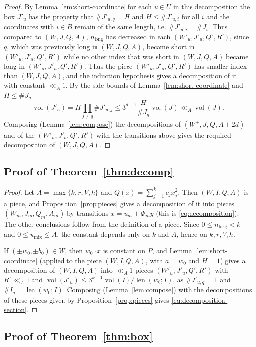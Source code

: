 \documentclass[a4paper,reqno,12pt]{amsart}
\theoremstyle{plain}
\theoremstyle{plain}
\theoremstyle{remark}
\theoremstyle{plain}
\newcommand{\vol}{\operatorname{vol}}
\newcommand{\len}{\operatorname{len}}
\theoremstyle{plain}
\theoremstyle{plain}
\begin{document}
{\begin{proof}
By Lemma \ref{lem:short-coordinate} for each $u \in U$ in this decomposition 
the box $J'_u$ has the property that $\# J'_{u,q} = H$ and $H \leq \# J'_{u,i}$ for all $i$
and the coordinates with $i \in B$ remain of the same length, i.e. $\# J'_{u,i} = \# J_i$. 
Thus compared to $(W, J, Q, A)$, $n_{\text{long}}$ has decreased in each $(W'_u,J'_u,Q',R')$, 
since $q$, which was previously long in $(W,J, Q, A)$, 
became short in $(W'_u,J'_u,Q',R')$ while no other index that was short 
in $(W, J, Q, A)$ became long in $(W'_u,J'_u,Q',R')$. 
Thus the piece $(W'_u,J'_u,Q',R')$ has smaller index than $(W, J, Q, A)$, and the
induction hypothesis gives a decomposition of it with constant $\ll_A1$. By the side bounds of
Lemma~\ref{lem:short-coordinate} and $H\le\#J_q$,
\[
 \vol(J'_u)=H\prod_{j\ne q}\#J'_{u,j}\le3^{d-1}\frac{H}{\#J_q}\vol(J)\ll_A\vol(J).
\]
Composing (Lemma~\ref{lem:compose}) the decompositions of $(W^+,J,Q,A+2d)$ and of the
$(W'_u,J'_u,Q',R')$ with the transitions above gives the required decomposition of $(W,J,Q,A)$.
\end{proof}

\subsection{Proof of Theorem~\ref{thm:decomp}}\label{sec:proof-decomp}
\begin{proof}
Let $A=\max\{k,r,V,h\}$ and $Q(x)=\sum_{j=1}^kc_jx_j^2$. Then $(W,I,Q,A)$ is a piece, and
Proposition~\ref{prop:pieces} gives a decomposition of it into pieces
$(W_m,J_m,Q_m,A_m)$ by transitions $x=u_m+\Phi_my$ (this is \eqref{eq:decomposition}). The other
conclusions follow from the definition of a piece.
Since $0\le n_{\mathrm{long}}<k$ and $0\le n_{\mathrm{mix}}\le A$, the constant depends only on $k$ and
$A$, hence on $k,r,V,h$.

If $(\pm w_0,\pm b_0)\in W$, then $w_0\cdot x$ is constant on $P$, and Lemma~\ref{lem:short-coordinate}
(applied to the piece $(W,I,Q,A)$, with $a=w_0$ and $H=1$) gives a decomposition of $(W,I,Q,A)$ into
$\ll_A1$ pieces $(W'_u,J'_u,Q',R')$ with $R'\ll_A1$ and $\vol(J'_u)\le3^{k-1}\vol(I)/\len(w_0;I)$, as
$\#J'_{u,q}=1$ and $\#I_q=\len(w_0;I)$. Composing (Lemma~\ref{lem:compose}) with the decompositions of
these pieces given by Proposition~\ref{prop:pieces} gives \eqref{eq:decomposition-section}.
\end{proof}

\subsection{Proof of Theorem~\ref{thm:box}}\label{sec:proofbox}

}
\end{document}
